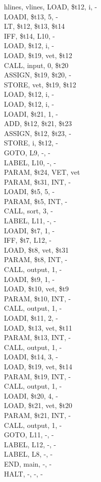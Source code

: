 \documentclass[
	12pt,				%
	oneside,
	a4paper,			%
	english,			%
	french,				%
	spanish,			%
	brazil,				%
	]{abntex2}
\begin{document}
\begin{longtblr}[
  caption = {Código Intermediário},
  label = {tab: ResultadosSortIntermediario},
]{
  hlines,
  vlines,
}
LOAD, \$t12, i, -\\
LOADI, \$t13, 5, -\\
LT, \$t12, \$t13, \$t14\\
IFF, \$t14, L10, -\\
LOAD, \$t12, i, -\\
LOAD, \$t19, vet, \$t12\\
CALL, input, 0, \$t20\\
ASSIGN, \$t19, \$t20, -\\
STORE, vet, \$t19, \$t12\\
LOAD, \$t12, i, -\\
LOAD, \$t12, i, -\\
LOADI, \$t21, 1, -\\
ADD, \$t12, \$t21, \$t23\\
ASSIGN, \$t12, \$t23, -\\
STORE, i, \$t12, -\\
GOTO, L9, -, -\\
LABEL, L10, -, -\\
PARAM, \$t24, VET, vet\\
PARAM, \$t31, INT, -\\
LOADI, \$t5, 5, -\\
PARAM, \$t5, INT, -\\
CALL, sort, 3, -\\
LABEL, L11, -, -\\
LOADI, \$t7, 1, -\\
IFF, \$t7, L12, -\\
LOAD, \$t8, vet, \$t31\\
PARAM, \$t8, INT, -\\
CALL, output, 1, -\\
LOADI, \$t9, 1, -\\
LOAD, \$t10, vet, \$t9\\
PARAM, \$t10, INT, -\\
CALL, output, 1, -\\
LOADI, \$t11, 2, -\\
LOAD, \$t13, vet, \$t11\\
PARAM, \$t13, INT, -\\
CALL, output, 1, -\\
LOADI, \$t14, 3, -\\
LOAD, \$t19, vet, \$t14\\
PARAM, \$t19, INT, -\\
CALL, output, 1, -\\
LOADI, \$t20, 4, -\\
LOAD, \$t21, vet, \$t20\\
PARAM, \$t21, INT, -\\
CALL, output, 1, -\\
GOTO, L11, -, -\\
LABEL, L12, -, -\\
LABEL, L8, -, -\\
END, main, -, -\\
HALT, -, -, -
\end{longtblr}
\end{document}
